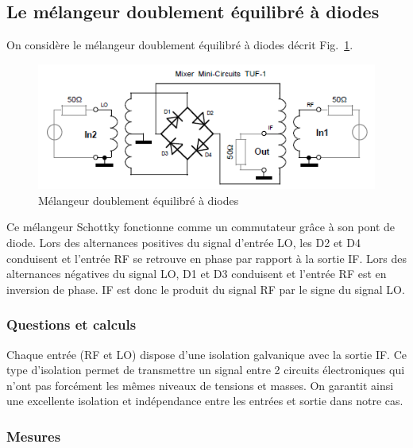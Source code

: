 \documentclass{article}
\begin{document}
%
%
%


\subsection{Le mélangeur doublement équilibré à diodes}

On considère le mélangeur doublement équilibré à diodes décrit Fig.~\ref{fig:schema_melangeur_doublediode}.

\begin{figure}[h!]
	\centering
	\includegraphics[width=.7\textwidth]{schema_melangeur_doublediode}
	\caption{Mélangeur doublement équilibré à diodes}
	\label{fig:schema_melangeur_doublediode}
\end{figure}

Ce mélangeur Schottky fonctionne comme un commutateur grâce à son pont de diode. Lors des alternances positives du signal d'entrée LO,  les D2 et D4 conduisent  et l'entrée RF se retrouve en phase  par rapport à la sortie IF. Lors des alternances négatives du signal LO, D1 et D3 conduisent et l'entrée RF est en inversion de phase. IF est donc le produit du signal RF par le signe du signal LO.

\subsubsection{Questions et calculs}


Chaque entrée (RF et LO) dispose d'une isolation galvanique avec la sortie IF. Ce type d'isolation permet de transmettre un signal entre 2 circuits électroniques qui n'ont pas forcément les mêmes niveaux de tensions et masses. On garantit ainsi une excellente isolation et indépendance entre les entrées et sortie dans notre cas.

\subsubsection{Mesures}
\end{document}
